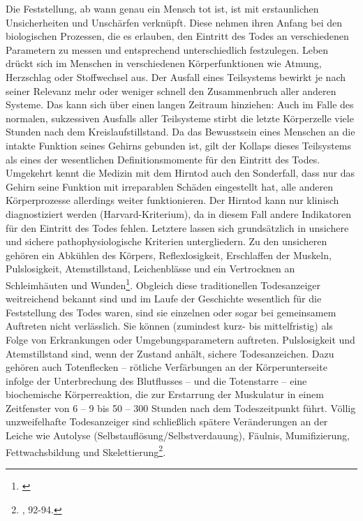 \documentclass[openany,twoside,twocolumn]{book}
\let\rmarkdownfootnote\footnote%
\def\footnote{\protect\rmarkdownfootnote}
\begin{document}
Die Feststellung, ab wann genau ein Mensch tot ist, ist mit erstaunlichen Unsicherheiten und Unschärfen verknüpft. Diese nehmen ihren Anfang bei den biologischen Prozessen, die es erlauben, den Eintritt des Todes an verschiedenen Parametern zu messen und entsprechend unterschiedlich festzulegen. Leben drückt sich im Menschen in verschiedenen Körperfunktionen wie Atmung, Herzschlag oder Stoffwechsel aus. Der Ausfall eines Teilsystems bewirkt je nach seiner Relevanz mehr oder weniger schnell den Zusammenbruch aller anderen Systeme. Das kann sich über einen langen Zeitraum hinziehen: Auch im Falle des normalen, sukzessiven Ausfalls aller Teilsysteme stirbt die letzte Körperzelle viele Stunden nach dem Kreislaufstillstand. Da das Bewusstsein eines Menschen an die intakte Funktion seines Gehirns gebunden ist, gilt der Kollaps dieses Teilsystems als eines der wesentlichen Definitionsmomente für den Eintritt des Todes. Umgekehrt kennt die Medizin mit dem Hirntod auch den Sonderfall, dass nur das Gehirn seine Funktion mit irreparablen Schäden eingestellt hat, alle anderen Körperprozesse allerdings weiter funktionieren. Der Hirntod kann nur klinisch diagnostiziert werden (Harvard-Kriterium), da in diesem Fall andere Indikatoren für den Eintritt des Todes fehlen. Letztere lassen sich grundsätzlich in unsichere und sichere pathophysiologische Kriterien untergliedern. Zu den unsicheren gehören ein Abkühlen des Körpers, Reflexlosigkeit, Erschlaffen der Muskeln, Pulslosigkeit, Atemstillstand, Leichenblässe und ein Vertrocknen an Schleimhäuten und Wunden\footnote{\textcite{forster_stichwort_1989}}. Obgleich diese traditionellen Todesanzeiger weitreichend bekannt sind und im Laufe der Geschichte wesentlich für die Feststellung des Todes waren, sind sie einzelnen oder sogar bei gemeinsamem Auftreten nicht verlässlich. Sie können (zumindest kurz- bis mittelfristig) als Folge von Erkrankungen oder Umgebungsparametern auftreten. Pulslosigkeit und Atemstillstand sind, wenn der Zustand anhält, sichere Todesanzeichen. Dazu gehören auch Totenflecken -- rötliche Verfärbungen an der Körperunterseite infolge der Unterbrechung des Blutflusses -- und die Totenstarre -- eine biochemische Körperreaktion, die zur Erstarrung der Muskulatur in einem Zeitfenster von 6 -- 9 bis 50 -- 300 Stunden nach dem Todeszeitpunkt führt. Völlig unzweifelhafte Todesanzeiger sind schließlich spätere Veränderungen an der Leiche wie Autolyse (Selbstauflösung/Selbstverdauung), Fäulnis, Mumifizierung, Fettwachsbildung und Skelettierung\footnote{\textcite{hofmann_rituelle_2008}, 92-94.}.
\end{document}
